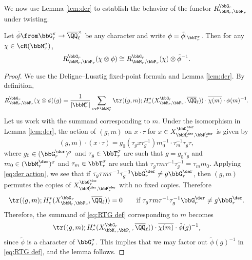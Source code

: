 We now use Lemma \ref{lem:der} to establish the behavior of the functor $R_{\bbM_r,\bbP_r}^{\bbG_r}$ under twisting.


\begin{proposition}\label{prop:twisting}
  Let $\tilde \phi \from \bbG_r^\sigma \to \overline \QQ_\ell^\times$ be any character and write $\phi = \tilde \phi|_{\bbT_r^\sigma}$. Then for any $\chi \in \cR(\bbM_r^\sigma)$,
  \begin{equation*}
    R_{\bbM_r,\bbP_r}^{\bbG_r}(\chi \otimes \phi) \cong R_{\bbM_r,\bbP_r}^{\bbG_r}(\chi) \otimes \tilde \phi^{-1}.
  \end{equation*}
\end{proposition}

\begin{proof}
  We use the Deligne--Lusztig fixed-point formula \cite[Theorem 3.2]{DL76} and Lemma \ref{lem:der}. By definition,
  \begin{equation}\label{eq:RTG def}
    R_{\bbM_r,\bbP_r}^{\bbG_r}(\chi \otimes \phi)(g)
    = \frac{1}{|\bbM_r^\sigma|} \sum_{m \in \bbM_r^\sigma} \tr((g,m); H_c^*(X_{\bbM_r,\bbP_r}^{\bbG_r},\overline \QQ_\ell)) \cdot \overline{\chi(m)} \cdot \phi(m)^{-1}.
  \end{equation}
  Let us work with the summand corresponding to $m$. Under the isomorphism in Lemma \ref{lem:der}, the action of $(g,m)$ on $x \cdot \tau$ for $x \in X_{\bbM_r^\der,\bbP_r^\der}^{\bbG_r^\der}$ is given by
  \begin{equation}\label{eq:der action}
    (g,m) \cdot (x \cdot \tau) = g_0 (\tau_g x \tau_g^{-1}) m_0^{-1} \cdot \tau_m^{-1} \tau_g \tau,
  \end{equation}
  where $g_0 \in (\bbG_r^{\der})^\sigma$ and $\tau_g \in \bbT_r^\sigma$ are such that $g = g_0 \tau_g$ and $m_0 \in (\bbM_r^{\der})^\sigma$ and $\tau_m \in \bbT_r^\sigma$ are such that $\tau_g \tau m \tau^{-1} \tau_g^{-1} = \tau_m m_0$. Applying \eqref{eq:der action}, we see that if $\tau_g \tau m \tau^{-1} \tau_g^{-1} \bbG_r^{\der} \neq g \bbG_r^{\der}$, then $(g,m)$  permutes the copies of $X_{\bbM_r^\der,\bbP_r^\der}^{\bbG_r^\der}$ with no fixed copies. Therefore
  \begin{equation*}
    \tr((g,m); H_c^*(X_{\bbM_r,\bbP_r}^{\bbG_r}, \overline \QQ_\ell)) = 0 \qquad \text{if $\tau_g \tau m \tau^{-1} \tau_g^{-1} \bbG_r^{\der} \neq g \bbG_r^{\der}$.}
  \end{equation*}
  Therefore, the summand of \eqref{eq:RTG def} corresponding to $m$ becomes
  \begin{equation*}
    \tr((g,m); H_c^*(X_{\bbM_r,\bbP_r}^{\bbG_r}, \overline \QQ_\ell)) \cdot \overline{\chi(m)} \cdot \tilde\phi(g)^{-1},
  \end{equation*}
  since $\tilde\phi$ is a character of $\bbG_r^\sigma$. This implies that we may factor out $\tilde\phi(g)^{-1}$ in \eqref{eq:RTG def}, and the lemma follows.
\end{proof}





